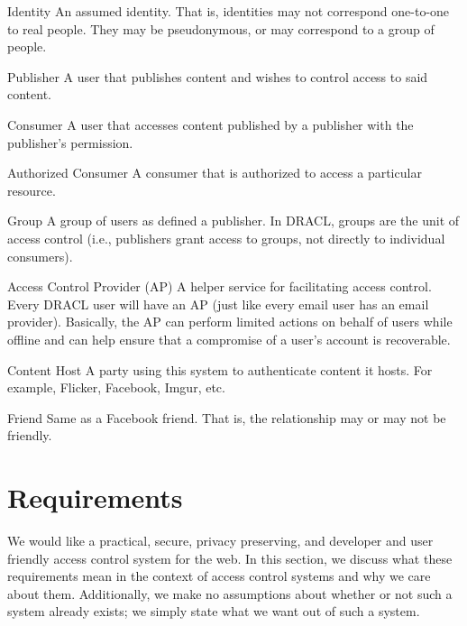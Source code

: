 \documentclass[pdftex,12pt,a4papaer]{report}
\begin{document}
\begin{compactdesc}
    \item[Identity] An assumed identity. That is, identities may not correspond
      one-to-one to real people. They may be pseudonymous, or may correspond to
      a group of people.
    \item[Publisher] A user that publishes content and wishes to control
      access to said content.
    \item[Consumer] A user that accesses content published by a publisher
      with the publisher's permission.
    \item[Authorized Consumer] A consumer that is authorized to access a
      particular resource.
    \item[Group] A group of users as defined a publisher. In DRACL, groups
      are the unit of access control (i.e., publishers grant access to
      groups, not directly to individual consumers).
    \item[Access Control Provider (AP)] A helper service for facilitating
      access control. Every DRACL user will have an AP (just like every email
      user has an email provider). Basically, the AP can perform limited actions on
      behalf of users while offline and can help ensure that a compromise of a user's
      account is recoverable.
    \item[Content Host] A party using this system to authenticate content it
      hosts. For example, Flicker, Facebook, Imgur, etc.
    \item[Friend] Same as a Facebook friend. That is, the relationship may or
      may not be friendly.
\end{compactdesc}

\section{Requirements}


We would like a practical, secure, privacy preserving, and developer and user
friendly access control system for the web. In this section, we discuss what
these requirements mean in the context of access control systems and why we care
about them. Additionally, we make no assumptions about whether or not such a
system already exists; we simply state what we want out of such a system.
\end{document}
